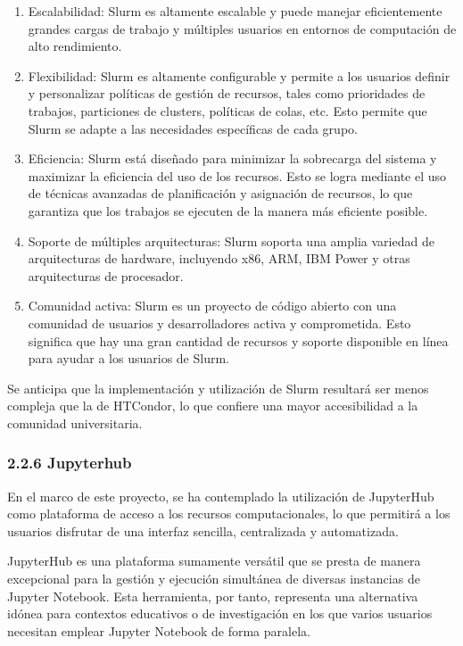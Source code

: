 \begin{doublespace}
    \begin{enumerate}
      \item Escalabilidad: Slurm es altamente escalable y puede manejar eficientemente grandes cargas de trabajo y múltiples usuarios en entornos de computación de alto rendimiento.
      \item Flexibilidad: Slurm es altamente configurable y permite a los usuarios definir y personalizar políticas de gestión de recursos, tales como prioridades de trabajos, particiones de clusters, políticas de colas, etc. Esto permite que Slurm se adapte a las necesidades específicas de cada grupo.
      \item Eficiencia: Slurm está diseñado para minimizar la sobrecarga del sistema y maximizar la eficiencia del uso de los recursos. Esto se logra mediante el uso de técnicas avanzadas de planificación y asignación de recursos, lo que garantiza que los trabajos se ejecuten de la manera más eficiente posible.
      \item Soporte de múltiples arquitecturas: Slurm soporta una amplia variedad de arquitecturas de hardware, incluyendo x86, ARM, IBM Power y otras arquitecturas de procesador.
      \item Comunidad activa: Slurm es un proyecto de código abierto con una comunidad de usuarios y desarrolladores activa y comprometida. Esto significa que hay una gran cantidad de recursos y soporte disponible en línea para ayudar a los usuarios de Slurm.
    \end{enumerate}

    Se anticipa que la implementación y utilización de Slurm resultará ser menos compleja que la de HTCondor, lo que confiere una mayor accesibilidad a la comunidad universitaria. \cite{RHEL-SLURM-1}

    \subsubsection{2.2.6 Jupyterhub}

    En el marco de este proyecto, se ha contemplado la utilización de JupyterHub como plataforma de acceso a los recursos computacionales, lo que permitirá a los usuarios disfrutar de una interfaz sencilla, centralizada y automatizada.

    JupyterHub es una plataforma sumamente versátil que se presta de manera excepcional para la gestión y ejecución simultánea de diversas instancias de Jupyter Notebook. Esta herramienta, por tanto, representa una alternativa idónea para contextos educativos o de investigación en los que varios usuarios necesitan emplear Jupyter Notebook de forma paralela.


\end{doublespace}
